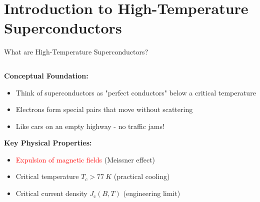 \documentclass[aspectratio=169,xcolor={table,dvipsnames}]{beamer}
\newcommand{\Kelvin}[1]{#1~K}
\newcommand{\Jc}{J_\text{c}}
\begin{document}
\section{Introduction to High-Temperature Superconductors}

\begin{frame}{What are High-Temperature Superconductors?}
    \begin{columns}
        \begin{column}{0.6\textwidth}
            \textbf{Conceptual Foundation:}
            \begin{itemize}
                \item Think of superconductors as "perfect conductors" below a critical temperature
                \item Electrons form special pairs that move without scattering
                \item Like cars on an empty highway - no traffic jams!
            \end{itemize}
            
            \vspace{0.3cm}
            \textbf{Key Physical Properties:}
            \begin{itemize}
                \item \textcolor{red}{Expulsion of magnetic fields} (Meissner effect)
                \item Critical temperature $T_c > \Kelvin{77}$ (practical cooling)
                \item Critical current density $\Jc(B,T)$ (engineering limit)
            \end{itemize}
            

\end{column}
\end{columns}
\end{frame}
\end{document}
